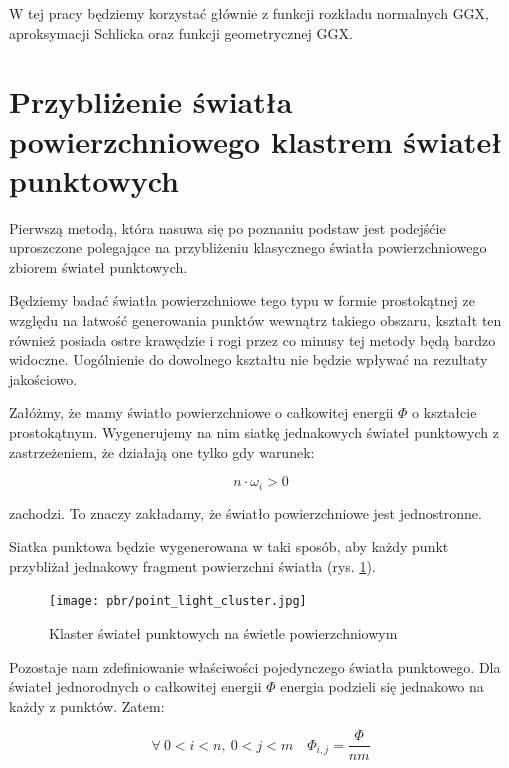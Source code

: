 \documentclass[../main.tex]{subfiles}
\begin{document}
W tej pracy będziemy korzystać głównie z funkcji rozkładu normalnych GGX,
aproksymacji Schlicka oraz funkcji geometrycznej GGX.


\section{Przybliżenie światła powierzchniowego klastrem świateł punktowych}

Pierwszą metodą, która nasuwa się po poznaniu podstaw jest podejśćie
uproszczone polegające na przybliżeniu klasycznego światła powierzchniowego
zbiorem świateł punktowych.

Będziemy badać światła powierzchniowe tego typu w formie prostokątnej ze względu
na łatwość generowania punktów wewnątrz takiego obszaru, kształt ten również
posiada ostre krawędzie i rogi przez co minusy tej metody będą bardzo widoczne.
Uogólnienie do dowolnego kształtu nie będzie wpływać na rezultaty jakościowo.

Załóżmy, że mamy światło powierzchniowe o całkowitej energii $\Phi$ o kształcie
prostokątnym. Wygenerujemy na nim siatkę jednakowych świateł punktowych z
zastrzeżeniem, że działają one tylko gdy warunek:

\[ n \cdot \omega_i > 0 \]

\noindent zachodzi. To znaczy zakładamy, że światło powierzchniowe jest
jednostronne.

Siatka punktowa będzie wygenerowana w taki sposób, aby każdy punkt przybliżał
jednakowy fragment powierzchni światła (rys. \ref{fig:PointLightCluster}).

\begin{figure}[ht]
  \centering
  \texttt{[image: pbr/point\_light\_cluster.jpg]}
  \caption{Klaster świateł punktowych na świetle powierzchniowym}
  \label{fig:PointLightCluster}
\end{figure}

Pozostaje nam zdefiniowanie właściwości pojedynczego światła punktowego.
Dla świateł jednorodnych o całkowitej energii $\Phi$ energia podzieli się
jednakowo na każdy z punktów. Zatem:

\[
  \forall\:{
    0<i<n,\:
    0<j<m
  } \quad
  \Phi_{i,j} = \frac{\Phi}{nm}
\]
\end{document}
